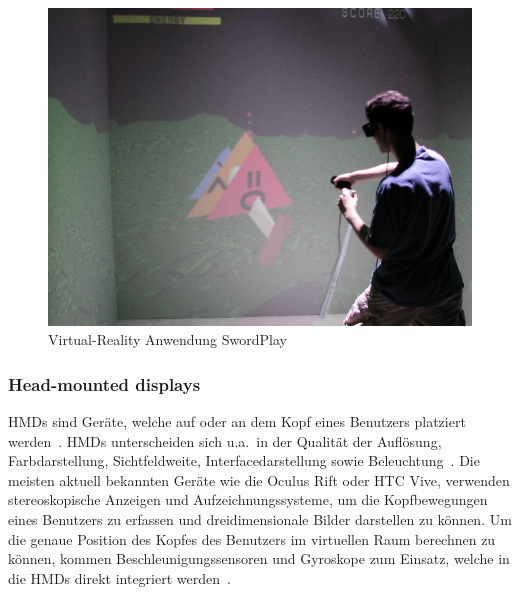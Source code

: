\begin{figure}[h]
\captionsetup{width=.7\linewidth}
\includegraphics[scale=0.5]{Bilder/Hauptteil/virtualreality}
\centering
\caption{Virtual-Reality Anwendung SwordPlay~\cite{anintroductionto3dspacial}}
\label{fig:vranwendung}
\end{figure}

\subsubsection{Head-mounted displays}
HMDs sind Geräte, welche auf oder an dem Kopf eines Benutzers platziert werden~\cite{hmds}. HMDs unterscheiden sich u.a.~in der Qualität der Auflösung, Farbdarstellung, Sichtfeldweite, Interfacedarstellung sowie Beleuchtung~\cite{hmdsinmedicine}. Die meisten aktuell bekannten Geräte wie die Oculus Rift oder HTC Vive, verwenden stereoskopische Anzeigen und Aufzeichnungssysteme, um die Kopfbewegungen eines Benutzers zu erfassen und dreidimensionale Bilder darstellen zu können. Um die genaue Position des Kopfes des Benutzers im virtuellen Raum berechnen zu können, kommen Beschleunigungssensoren und Gyroskope zum Einsatz, welche in die HMDs direkt integriert werden~\cite{hmds}.\\

